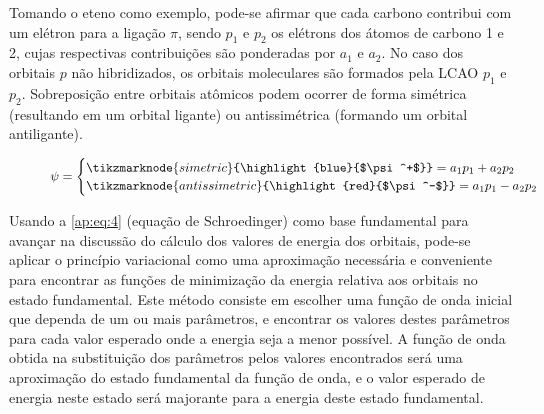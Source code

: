 Tomando o eteno como exemplo, pode-se afirmar que cada carbono contribui com um elétron para a ligação $\pi$, sendo $p_1$ e $p_2$ os elétrons dos átomos de carbono 1 e 2, cujas respectivas contribuições são ponderadas por $a_1$ e $a_2$. No caso dos orbitais $p$ não hibridizados, os orbitais moleculares são formados pela \gls{LCAO} $p_1$ e $p_2$. Sobreposição entre orbitais atômicos podem ocorrer de forma simétrica (resultando em um orbital ligante) ou antissimétrica (formando um orbital antiligante).

\begin{figure}[htb]
    \vspace{2\baselineskip}
\begin{equation}
    \label{ap:eq:3}
    \psi =
    \begin{cases}
\tikzmarknode{simetric}{\highlight{blue}{$\psi^+$}} = a_1 p_1 + a_2 p_2 \\
\tikzmarknode{antissimetric}{\highlight{red}{$\psi^-$}} = a_1 p_1 - a_2 p_2
    \end{cases}
\end{equation}
\end{figure}

Usando a \autoref{ap:eq:4} (equação de Schroedinger) como base fundamental para avançar na discussão do cálculo dos valores de energia dos orbitais, pode-se aplicar o princípio variacional como uma aproximação necessária e conveniente para encontrar as funções de minimização da energia relativa aos orbitais no estado fundamental. Este método consiste em escolher uma função de onda inicial que dependa de um ou mais parâmetros, e encontrar os valores destes parâmetros para cada valor esperado onde a energia seja a menor possível. A função de onda obtida na substituição dos parâmetros pelos valores encontrados será uma aproximação do estado fundamental da função de onda, e o valor esperado de energia neste estado será majorante para a energia deste estado fundamental.

